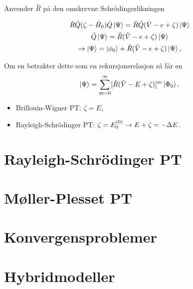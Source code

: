 \documentclass{beamer}
\begin{document}
\begin{frame}
	Anvender $\hat R$ på den omskrevne Schrödingerlikningen

	\begin{gather}
		\hat R \hat Q (\zeta  - \hat H_0) \hat Q \ket{\Psi} = \hat R \hat Q(\hat V - e + \zeta)\ket{\Psi} \\
		\hat Q\ket{\Psi} = \hat R(\hat V - e + \zeta)\ket{\Psi} \\
		\rightarrow \ket{\Psi} = \ket{\phi_0} + \hat R(\hat V - e + \zeta)\ket{\Psi}, 
	\end{gather}
	
	Om en betrakter dette som en rekursjonsrelasjon så får en
	\begin{equation}
		\ket{\Psi} = \sum_{m=0}^\infty [\hat R(\hat V - E + \zeta)]^m \ket{\Phi_0}.
	\end{equation}
	
	\begin{itemize}
		\item Brillouin-Wigner PT: $\zeta = E$,
		\item Rayleigh-Schrödinger PT: $\zeta = E_0^{(0)} \to \-E + \zeta = - \Delta E$.  	
	\end{itemize}

\end{frame}

\section{Rayleigh-Schrödinger PT}
\section{Møller-Plesset PT}
\section{Konvergensproblemer}
\section{Hybridmodeller}
\end{document}

